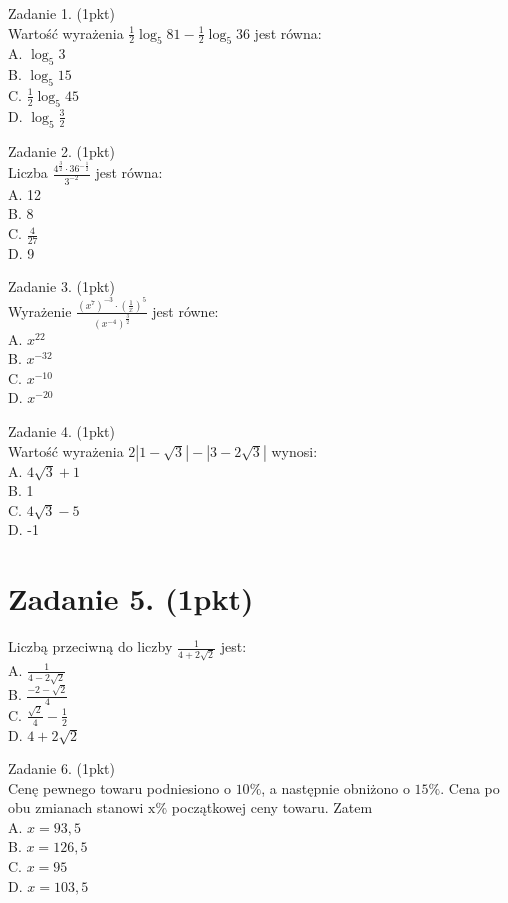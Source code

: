 \documentclass[10pt]{article}
\begin{document}
Zadanie 1. (1pkt)\\
Wartość wyrażenia \(\frac{1}{2} \log _{5} 81-\frac{1}{2} \log _{5} 36\) jest równa:\\
A. \(\log _{5} 3\)\\
B. \(\log _{5} 15\)\\
C. \(\frac{1}{2} \log _{5} 45\)\\
D. \(\log _{5} \frac{3}{2}\)

Zadanie 2. (1pkt)\\
Liczba \(\frac{4^{\frac{3}{2}} \cdot 36^{-\frac{1}{2}}}{3^{-2}}\) jest równa:\\
A. 12\\
B. 8\\
C. \(\frac{4}{27}\)\\
D. 9

Zadanie 3. (1pkt)\\
Wyrażenie \(\frac{\left(x^{7}\right)^{-3} \cdot\left(\frac{1}{x}\right)^{5}}{\left(x^{-4}\right)^{\frac{3}{2}}}\) jest równe:\\
A. \(x^{22}\)\\
B. \(x^{-32}\)\\
C. \(x^{-10}\)\\
D. \(x^{-20}\)

Zadanie 4. (1pkt)\\
Wartość wyrażenia \(2|1-\sqrt{3}|-|3-2 \sqrt{3}|\) wynosi:\\
A. \(4 \sqrt{3}+1\)\\
B. 1\\
C. \(4 \sqrt{3}-5\)\\
D. -1

\section*{Zadanie 5. (1pkt)}
Liczbą przeciwną do liczby \(\frac{1}{4+2 \sqrt{2}}\) jest:\\
A. \(\frac{1}{4-2 \sqrt{2}}\)\\
B. \(\frac{-2-\sqrt{2}}{4}\)\\
C. \(\frac{\sqrt{2}}{4}-\frac{1}{2}\)\\
D. \(4+2 \sqrt{2}\)

Zadanie 6. (1pkt)\\
Cenę pewnego towaru podniesiono o \(10 \%\), a następnie obniżono o \(15 \%\). Cena po obu zmianach stanowi \(\mathrm{x} \%\) początkowej ceny towaru. Zatem\\
A. \(x=93,5\)\\
B. \(x=126,5\)\\
C. \(x=95\)\\
D. \(x=103,5\)
\end{document}
